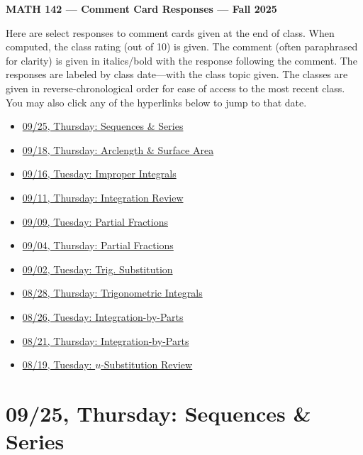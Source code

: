 \documentclass[11pt,letterpaper]{article}
\begin{document}
\begin{center} {\bfseries \LARGE MATH 142 --- Comment Card Responses --- Fall 2025} \end{center}

Here are select responses to comment cards given at the end of class. When computed, the class rating (out of 10) is given. The comment (often paraphrased for clarity) is given in italics/bold with the response following the comment. The responses are labeled by class date---with the class topic given. The classes are given in reverse-chronological order for ease of access to the most recent class. You may also click any of the hyperlinks below to jump to that date.

\begin{itemize}
\item \hyperref[09-25]{09/25, Thursday: Sequences \& Series}
\item \hyperref[09-18]{09/18, Thursday: Arclength \& Surface Area}
\item \hyperref[09-16]{09/16, Tuesday: Improper Integrals}
\item \hyperref[09-11]{09/11, Thursday: Integration Review}
\item \hyperref[09-09]{09/09, Tuesday: Partial Fractions}
\item \hyperref[09-04]{09/04, Thursday: Partial Fractions}
\item \hyperref[09-02]{09/02, Tuesday: Trig. Substitution}
\item \hyperref[08-28]{08/28, Thursday: Trigonometric Integrals}
\item \hyperref[08-26]{08/26, Tuesday: Integration-by-Parts}
\item \hyperref[08-21]{08/21, Thursday: Integration-by-Parts}
\item \hyperref[08-19]{08/19, Tuesday: $u$-Substitution Review}
\end{itemize}

\newpage
\section*{09/25, Thursday: Sequences \& Series\label{09-25}}
\end{document}
